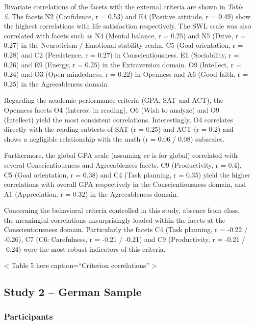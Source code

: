 \documentclass[,man,floatsintext]{apa6}
\begin{document}
Bivariate correlations of the facets with the external criteria are
shown in \emph{Table 5}. The facets N2 (Confidence, r = 0.53) and E4
(Positive attitude, r = 0.49) show the highest correlations with life
satisfaction respectively. The SWL scale was also correlated with facets
such as N4 (Mental balance, r = 0.25) and N5 (Drive, r = 0.27) in the
Neuroticism / Emotional stability realm. C5 (Goal orientation, r = 0.28)
and C2 (Persistence, r = 0.27) in Conscientiousness. E1 (Sociability, r
= 0.26) and E9 (Energy, r = 0.25) in the Extraversion domain. O9
(Intellect, r = 0.24) and O3 (Open-mindedness, r = 0.22) in Openness and
A6 (Good faith, r = 0.25) in the Agreeableness domain.

Regarding the academic performance criteria (GPA, SAT and ACT), the
Openness facets O4 (Interest in reading), O6 (Wish to analyze) and O9
(Intellect) yield the most consistent correlations. Interestingly, O4
correlates directly with the reading subtests of SAT (r = 0.25) and ACT
(r = 0.2) and shows a negligible relationship with the math (r = 0.06 /
0.08) subscales.

Furthermore, the global GPA scale (assuming cc is for global) correlated
with several Conscientiousness and Agreeableness facets. C9
(Productivity, r = 0.4), C5 (Goal orientation, r = 0.38) and C4 (Task
planning, r = 0.35) yield the higher correlations with overall GPA
respectively in the Conscientiousness domain, and A1 (Appreciation, r =
0.32) in the Agreeableness domain.

Concerning the behavioral criteria controlled in this study, absence
from class, the meaningful correlations unsurprisingly loaded within the
facets at the Conscientiousness domain. Particularly the facets C4 (Task
planning, r = -0.22 / -0.26), C7 (C6: Carefulness, r = -0.21 / -0.21)
and C9 (Productivity, r = -0.21 / -0.24) were the most robust indicators
of this criteria.

\vspace{5mm}

\textless{} Table 5 here caption=\enquote{Criterion correlations}
\textgreater{}

\vspace{5mm}

\subsection{Study 2 -- German Sample}\label{study-2-german-sample}

\subsubsection{Participants}\label{participants-1}
\end{document}
